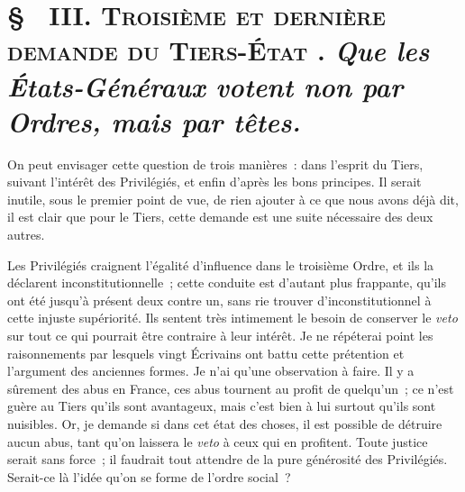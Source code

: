 \documentclass[french,twoside]{book} %
\begin{document}
\section[{§  III. Troisième et dernière demande du Tiers-État . Que les États-Généraux votent non par Ordres, mais par têtes.}]{ \textsc{§ } {\scshape III. Troisième et dernière demande du Tiers-État} \textsc{. } {\itshape Que les États-Généraux votent non par Ordres, mais par têtes.} }
\noindent On peut envisager cette question de trois manières : dans l’esprit du Tiers, suivant l’intérêt des Privilégiés, et enfin d’après les bons principes. Il serait inutile, sous le premier point de vue, de rien ajouter à ce que nous avons déjà dit, il est clair que pour le Tiers, cette demande est une suite nécessaire des deux autres.\par
Les Privilégiés craignent l’égalité d’influence dans le troisième Ordre, et ils la déclarent inconstitutionnelle ; cette conduite est d’autant plus frappante, qu’ils ont été jusqu’à présent deux contre un, sans rie trouver d’inconstitutionnel à cette injuste supériorité. Ils sentent très intimement le besoin de conserver le {\itshape veto} sur tout ce qui pourrait être contraire à leur intérêt. Je ne répéterai point les raisonnements par lesquels vingt Écrivains ont battu cette prétention et l’argument des anciennes formes. Je n’ai qu’une observation à faire. Il y a sûrement des abus en France, ces abus tournent au profit de quelqu’un ; ce n’est guère au Tiers qu’ils sont avantageux, mais c’est bien à lui surtout qu’ils sont nuisibles. Or, je demande si dans cet état des choses, il est possible de détruire aucun abus, tant qu’on laissera le {\itshape veto} à ceux qui en profitent. Toute justice serait sans force ; il faudrait tout attendre de la pure générosité des Privilégiés. Serait-ce là l’idée qu’on se forme de l’ordre social ?\par
\end{document}
